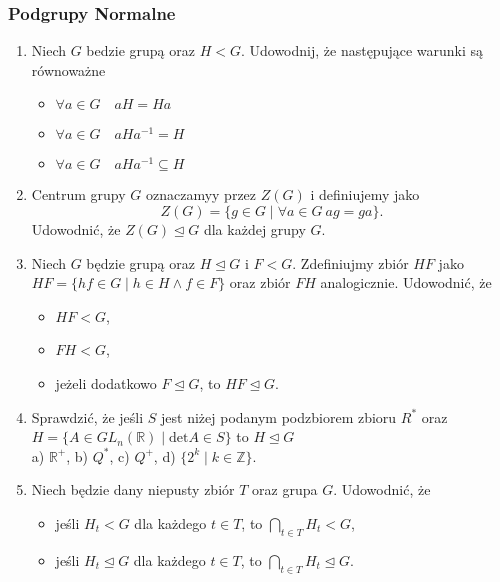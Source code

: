 \documentclass{article}
\begin{document}
\subsubsection*{Podgrupy Normalne}
\begin{enumerate}[resume]
    \item Niech $G$ bedzie grupą oraz $H < G$. Udowodnij, że następujące warunki są równoważne
        \begin{itemize}
            \item $\forall a \in G \quad aH = Ha$
            \item $\forall a \in G \quad aHa^{-1} = H$
            \item $\forall a \in G \quad aHa^{-1} \subseteq H$
        \end{itemize}
    \item Centrum grupy $G$ oznaczamyy przez $Z(G)$ i definiujemy jako
        $$Z(G) = \{ g\in G \mid \forall a \in G \ ag = ga\}.$$
        Udowodnić, że $Z(G) \trianglelefteq G$ dla każdej grupy $G$.
    \item Niech $G$ będzie grupą oraz $H \trianglelefteq G$ i $F < G$. Zdefiniujmy zbiór $HF$ jako $HF = \{ hf \in G \mid h \in H \land f \in F\}$ oraz zbiór $FH$ analogicznie. Udowodnić, że
        \begin{itemize}
            \item $HF < G$,
            \item $FH < G$,
            \item jeżeli dodatkowo $F \trianglelefteq G$, to $HF \trianglelefteq G$.
        \end{itemize}
    \item Sprawdzić, że jeśli $S$ jest niżej podanym podzbiorem zbioru $R^*$ oraz  \\  $H = \{ A \in GL_n(\mathbb{R}) \mid \text{det}A \in S\}$ to $H \trianglelefteq G$ \\
        a) $\mathbb{R}^+$, \qquad b) $Q^*$, \qquad c) $Q^{+}$, \qquad d) $\{ 2^k \mid k \in \mathbb{Z} \}$.
    \item Niech będzie dany niepusty zbiór $T$ oraz grupa $G$. Udowodnić, że
        \begin{itemize}
            \item jeśli $H_t < G$ dla każdego $t \in T$, to $\bigcap_{t \in T}H_t < G$,
            \item jeśli $H_t \trianglelefteq G$ dla każdego $t \in T$, to $\bigcap_{t \in T}H_t \trianglelefteq G$.
        \end{itemize}
\end{enumerate}
\end{document}
